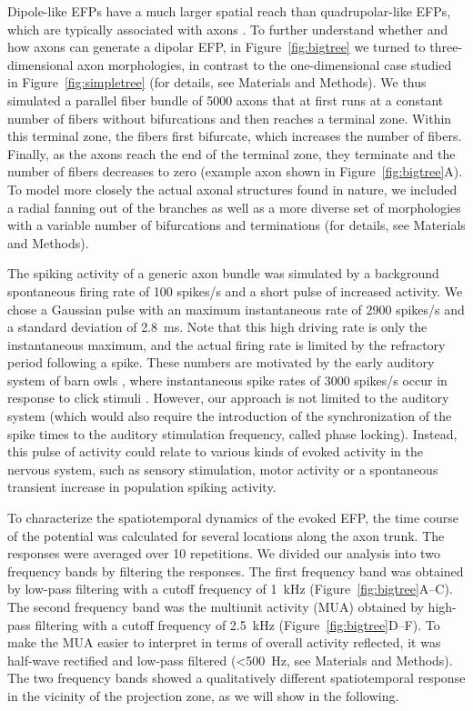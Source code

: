 \documentclass[]{elife}
\begin{document}
Dipole-like EFPs have a much larger spatial reach than quadrupolar-like
EFPs, which are typically associated with axons
\citep{Nunez2006Electric}. To further understand whether and how axons
can generate a dipolar EFP, in Figure~\ref{fig:bigtree} we turned to
three-dimensional axon morphologies, in contrast to the one-dimensional
case studied in Figure~\ref{fig:simpletree} (for details, see Materials
and Methods). We thus simulated a parallel fiber bundle of 5000 axons
that at first runs at a constant number of fibers without bifurcations
and then reaches a terminal zone. Within this terminal zone, the fibers
first bifurcate, which increases the number of fibers. Finally, as the
axons reach the end of the terminal zone, they terminate and the number
of fibers decreases to zero (example axon shown in
Figure~\ref{fig:bigtree}A). To model more closely the actual axonal
structures found in nature, we included a radial fanning out of the
branches as well as a more diverse set of morphologies with a variable
number of bifurcations and terminations (for details, see Materials and
Methods).

The spiking activity of a generic axon bundle was simulated by a
background spontaneous firing rate of 100 spikes/s and a short pulse of
increased activity. We chose a Gaussian pulse with an maximum
instantaneous rate of 2900 spikes/s and a standard deviation of 2.8~ms.
Note that this high driving rate is only the instantaneous maximum, and
the actual firing rate is limited by the refractory period following a
spike. These numbers are motivated by the early auditory system of barn
owls \citep{koppl97a, Sullivan1984Segregation, Konishi1985Owls}, where
instantaneous spike rates of 3000 spikes/s occur in response to click
stimuli \citep{Carr2016Role}. However, our approach is not limited to
the auditory system (which would also require the introduction of the
synchronization of the spike times to the auditory stimulation
frequency, called phase locking). Instead, this pulse of activity could
relate to various kinds of evoked activity in the nervous system, such
as sensory stimulation, motor activity or a spontaneous transient
increase in population spiking activity.

To characterize the spatiotemporal dynamics of the evoked EFP, the time
course of the potential was calculated for several locations along the
axon trunk. The responses were averaged over 10 repetitions. We divided
our analysis into two frequency bands by filtering the responses. The
first frequency band was obtained by low-pass filtering with a cutoff
frequency of 1~kHz (Figure~\ref{fig:bigtree}A--C). The second frequency
band was the multiunit activity (MUA) obtained by high-pass filtering
with a cutoff frequency of 2.5~kHz (Figure~\ref{fig:bigtree}D--F). To
make the MUA easier to interpret in terms of overall activity reflected,
it was half-wave rectified and low-pass filtered (\textless{}500~Hz, see
Materials and Methods). The two frequency bands showed a qualitatively
different spatiotemporal response in the vicinity of the projection
zone, as we will show in the following.
\end{document}

